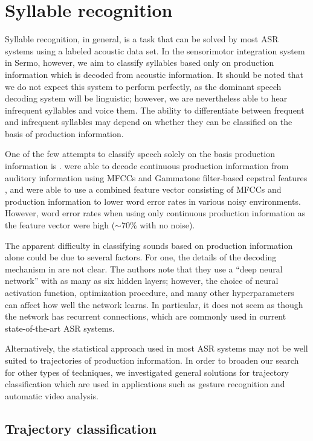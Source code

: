 \section{Syllable recognition}

Syllable recognition, in general,
is a task that can be solved
by most ASR systems
using a labeled acoustic data set.
In the sensorimotor integration system
in Sermo, however,
we aim to classify syllables
based only on production information
which is decoded from acoustic information.
It should be noted that we do not expect
this system to perform perfectly,
as the dominant speech decoding system
will be linguistic;
however, we are nevertheless able
to hear infrequent syllables
and voice them.
The ability to differentiate
between frequent and infrequent syllables
may depend on whether they
can be classified
on the basis of production information.

One of the few attempts to classify speech
solely on the basis production information
is \cite{mitra2014}.
\citeauthor{mitra2014} were able to
decode continuous production information
from auditory information
using MFCCs and Gammatone filter-based
cepstral features \cite{mitra2012},
and were able to use a combined feature vector
consisting of MFCCs and production information
to lower word error rates
in various noisy environments.
However, word error rates
when using only continuous production information
as the feature vector
were high ($\sim$70\% with no noise).

The apparent difficulty
in classifying sounds based on
production information alone
could be due to several factors.
For one, the details of the decoding mechanism
in \cite{mitra2014} are not clear.
The authors note that they use a
``deep neural network''
with as many as six hidden layers;
however, the choice of neural activation function,
optimization procedure,
and many other hyperparameters
can affect how well the network learns.
In particular, it does not seem as though
the network has recurrent connections,
which are commonly used in
current state-of-the-art ASR systems.

Alternatively, the statistical approach
used in most ASR systems
may not be well suited to
trajectories of production information.
In order to broaden our search
for other types of techniques,
we investigated general solutions
for trajectory classification
which are used in applications
such as gesture recognition
and automatic video analysis.

\subsection{Trajectory classification}
\label{sec:prev-classification}

